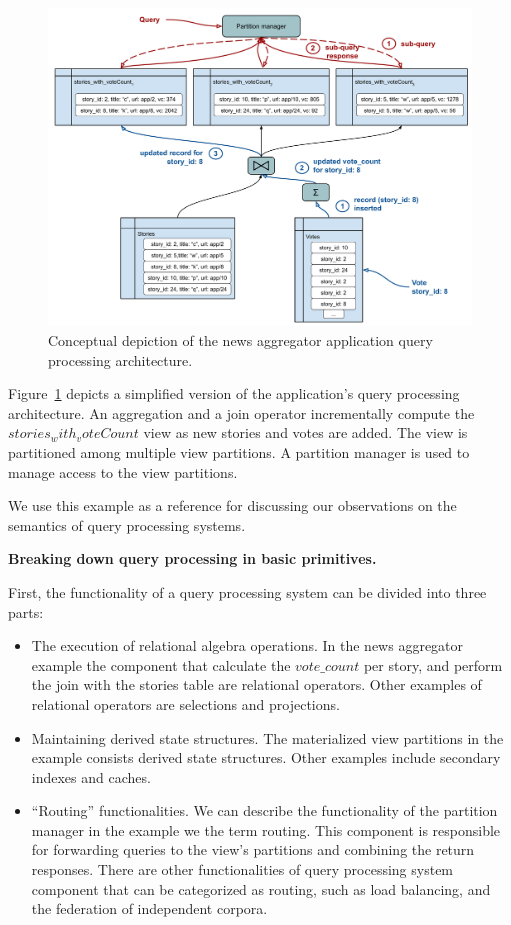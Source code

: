 \begin{figure}[H]
  \centering
    \includegraphics[width=\textwidth]{./figures/design_pattern/running_example.pdf}
    \caption{Conceptual depiction of the news aggregator application query processing architecture.}
    \label{fig:running_example}
\end{figure}


Figure~\ref{fig:running_example} depicts a simplified version of the application's query processing architecture.
An aggregation and a join operator incrementally compute the $stories_with_voteCount$ view as new stories and votes are added.
The view is partitioned among multiple view partitions.
A partition manager is used to manage access to the view partitions.

We use this example as a reference for discussing our observations on the semantics of query processing systems.

\vspace{12pt}
\noindent
\textbf{Breaking down query processing in basic primitives.}

\noindent
First, the functionality of a query processing system can be divided into three parts:
\begin{itemize}
  \item The execution of relational algebra operations.
  In the news aggregator example the component that calculate the $vote\_count$ per story,
  and perform the join with the stories table are relational operators.
  Other examples of relational operators are selections and projections.

  \item Maintaining derived state structures.
  The materialized view partitions in the example consists derived state structures.
  Other examples include secondary indexes and caches.

  \item ``Routing'' functionalities.
  We can describe the functionality of the partition manager in the example we the term routing.
  This component is responsible for forwarding queries to the view's partitions and combining the return responses.
  There are other functionalities of query processing system component that can be categorized as routing,
  such as load balancing, and the federation of independent corpora.
\end{itemize}


